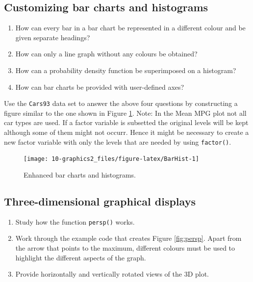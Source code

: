 \documentclass[
]{book}
\begin{document}
\subsection{Customizing bar charts and histograms}\label{customizing-bar-charts-and-histograms}

\begin{enumerate}
\def\labelenumi{(\alph{enumi})}
\item
  How can every bar in a bar chart be represented in a different colour and be given separate headings?
\item
  How can only a line graph without any colours be obtained?
\item
  How can a probability density function be superimposed on a histogram?
\item
  How can bar charts be provided with user-defined axes?
\end{enumerate}

Use the \texttt{Cars93} data set to answer the above four questions by constructing a figure similar to the one shown in Figure \ref{fig:BarHist}. Note: In the Mean MPG plot not all car types are used. If a factor variable is subsetted the original levels will be kept although some of them might not occurr. Hence it might be necessary to create a new factor variable with only the levels that are needed by using \texttt{factor()}.

\begin{figure}
\texttt{[image: 10-graphics2\_files/figure-latex/BarHist-1]} \caption{Enhanced bar charts and histograms.}\label{fig:BarHist}
\end{figure}

\subsection{Three-dimensional graphical displays}\label{three-dimensional-graphical-displays}

\begin{enumerate}
\def\labelenumi{(\alph{enumi})}
\item
  Study how the function \texttt{persp()} works.
\item
  Work through the example code that creates Figure \ref{fig:persp}. Apart from the arrow that points to the maximum, different colours must be used to highlight the different aspects of the graph.
\item
  Provide horizontally and vertically rotated views of the 3D plot.
\end{enumerate}
\end{document}
